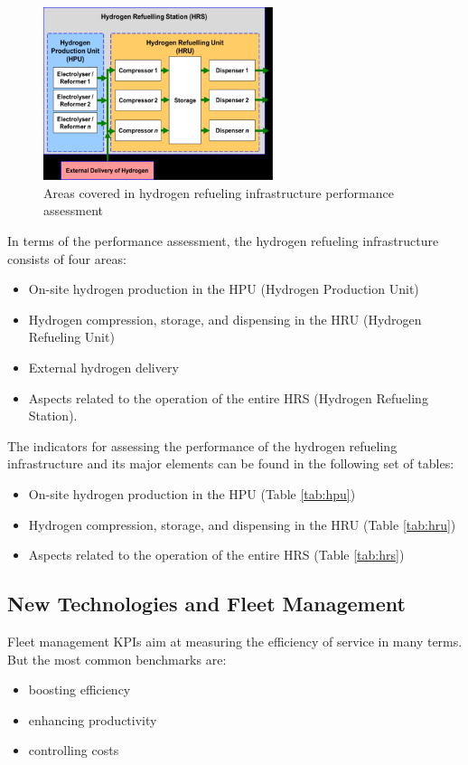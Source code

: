 \begin{figure}[h!]
    \centering
    \includegraphics[width=0.6\textwidth]{Images/manteinance/areas_hydrogen.png}
    \caption{Areas covered in hydrogen refueling infrastructure performance assessment }
    \label{fig:areashydrogen}
\end{figure}

In terms of the performance assessment, the hydrogen refueling infrastructure consists of four areas: 

\begin{itemize}
    \item On-site hydrogen production in the HPU (Hydrogen Production Unit)
    \item Hydrogen compression, storage, and dispensing in the HRU (Hydrogen Refueling Unit)
    \item External hydrogen delivery
    \item Aspects related to the operation of the entire HRS (Hydrogen Refueling Station). 
\end{itemize}

The indicators for assessing the performance of the hydrogen refueling infrastructure and its major elements can be found in the following set of tables: 
\begin{itemize}
    \item On-site hydrogen production in the HPU (Table \ref{tab:hpu})
    \item Hydrogen compression, storage, and dispensing in the HRU (Table \ref{tab:hru})
    \item Aspects related to the operation of the entire HRS (Table \ref{tab:hrs})
\end{itemize}






\newpage
\subsection{New Technologies and Fleet Management}
Fleet management KPIs aim at measuring the efficiency of service in many terms. But the most common benchmarks are:
\begin{itemize}
    \item boosting efficiency
    \item enhancing productivity
    \item controlling costs
\end{itemize}

